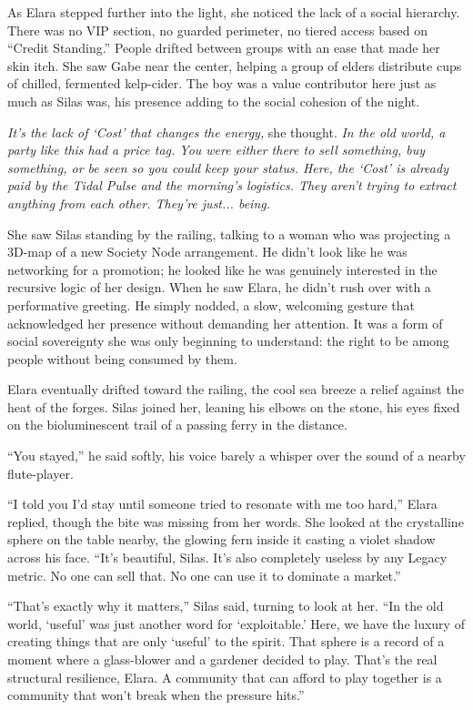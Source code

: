 As Elara stepped further into the light, she noticed the lack of a social hierarchy. There was no VIP section, no guarded perimeter, no tiered access based on ``Credit Standing.'' People drifted between groups with an ease that made her skin itch. She saw Gabe near the center, helping a group of elders distribute cups of chilled, fermented kelp-cider. The boy was a value contributor here just as much as Silas was, his presence adding to the social cohesion of the night.

\textit{It's the lack of `Cost' that changes the energy,} she thought. \textit{In the old world, a party like this had a price tag. You were either there to sell something, buy something, or be seen so you could keep your status. Here, the `Cost' is already paid by the Tidal Pulse and the morning's logistics. They aren't trying to extract anything from each other. They're just... being.} 

She saw Silas standing by the railing, talking to a woman who was projecting a 3D-map of a new Society Node arrangement. He didn't look like he was networking for a promotion; he looked like he was genuinely interested in the recursive logic of her design. When he saw Elara, he didn't rush over with a performative greeting. He simply nodded, a slow, welcoming gesture that acknowledged her presence without demanding her attention. It was a form of social sovereignty she was only beginning to understand: the right to be among people without being consumed by them.


Elara eventually drifted toward the railing, the cool sea breeze a relief against the heat of the forges. Silas joined her, leaning his elbows on the stone, his eyes fixed on the bioluminescent trail of a passing ferry in the distance. 

``You stayed,'' he said softly, his voice barely a whisper over the sound of a nearby flute-player. 

``I told you I'd stay until someone tried to resonate with me too hard,'' Elara replied, though the bite was missing from her words. She looked at the crystalline sphere on the table nearby, the glowing fern inside it casting a violet shadow across his face. ``It's beautiful, Silas. It's also completely useless by any Legacy metric. No one can sell that. No one can use it to dominate a market.''

``That's exactly why it matters,'' Silas said, turning to look at her. ``In the old world, `useful' was just another word for `exploitable.' Here, we have the luxury of creating things that are only `useful' to the spirit. That sphere is a record of a moment where a glass-blower and a gardener decided to play. That's the real structural resilience, Elara. A community that can afford to play together is a community that won't break when the pressure hits.''

